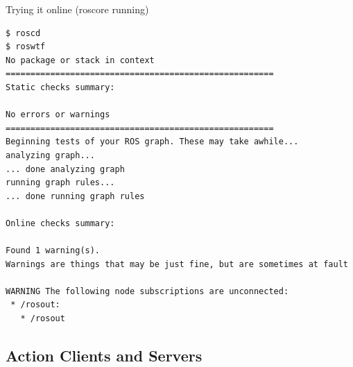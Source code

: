 \begin{frame}[fragile]{Trying it online (roscore running)}
\begin{lstlisting}[language=shell]
$ roscd
$ roswtf
No package or stack in context
======================================================
Static checks summary:

No errors or warnings
======================================================
Beginning tests of your ROS graph. These may take awhile...
analyzing graph...
... done analyzing graph
running graph rules...
... done running graph rules

Online checks summary:

Found 1 warning(s).
Warnings are things that may be just fine, but are sometimes at fault

WARNING The following node subscriptions are unconnected:
 * /rosout:
   * /rosout
\end{lstlisting}
\end{frame}


\subsection{Action Clients and Servers}

